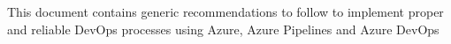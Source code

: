 This document contains generic recommendations to follow to implement proper and reliable DevOps processes
using Azure, Azure Pipelines and Azure DevOps